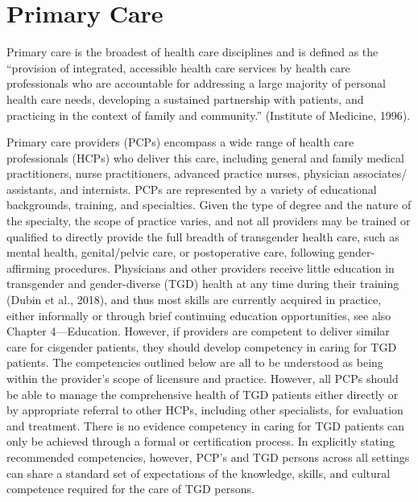 \documentclass[
]{book}
\begin{document}
\hypertarget{primary-care}{%
\chapter{Primary Care}\label{primary-care}}

Primary care is the broadest of health care disciplines and is defined as the ``provision of integrated, accessible health care services by health
care professionals who are accountable for
addressing a large majority of personal health
care needs, developing a sustained partnership
with patients, and practicing in the context of
family and community.'' (Institute of
Medicine, 1996).

Primary care providers (PCPs) encompass a
wide range of health care professionals (HCPs)
who deliver this care, including general and family medical practitioners, nurse practitioners,
advanced practice nurses, physician associates/
assistants, and internists. PCPs are represented
by a variety of educational backgrounds, training,
and specialties. Given the type of degree and the
nature of the specialty, the scope of practice varies, and not all providers may be trained or qualified to directly provide the full breadth of
transgender health care, such as mental health,
genital/pelvic care, or postoperative care, following gender-affirming procedures. Physicians and
other providers receive little education in transgender and gender-diverse (TGD) health at any
time during their training (Dubin et al., 2018),
and thus most skills are currently acquired in
practice, either informally or through brief continuing education opportunities, see also Chapter
4---Education. However, if providers are competent to deliver similar care for cisgender patients,
they should develop competency in caring for
TGD patients. The competencies outlined below
are all to be understood as being within the provider's scope of licensure and practice. However,
all PCPs should be able to manage the comprehensive health of TGD patients either directly or
by appropriate referral to other HCPs, including
other specialists, for evaluation and treatment.
There is no evidence competency in caring for
TGD patients can only be achieved through a
formal or certification process. In explicitly stating recommended competencies, however, PCP's
and TGD persons across all settings can share a
standard set of expectations of the knowledge,
skills, and cultural competence required for the
care of TGD persons.
\end{document}
